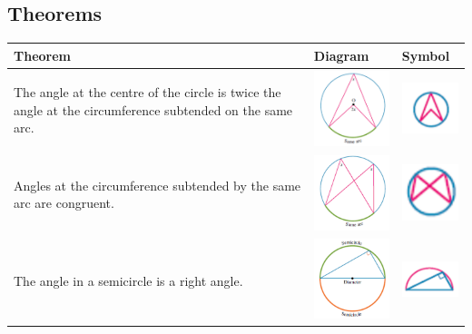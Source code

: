 \documentclass[a4paper,10pt]{report}
\begin{document}
\subsection{Theorems}
\begin{center}
	\begin{tabular}[center]{p{5cm}|p{3cm}|p{2cm}}
		Theorem                                                                                                              & Diagram                                       & Symbol                                               \\ \hline
		The angle at the centre of the circle is twice the angle at the circumference subtended on the same arc.             & \includegraphics[width=3cm]{circle theorem 1} & \includegraphics[width=2cm]{circle theorem 1 symbol} \\
		Angles at the circumference subtended by the same arc are congruent.                                                 & \includegraphics[width=3cm]{circle theorem 2} & \includegraphics[width=2cm]{circle theorem 2 symbol} \\
		The angle in a semicircle is a right angle.                                                                          & \includegraphics[width=3cm]{circle theorem 3} & \includegraphics[width=2cm]{circle theorem 3 symbol} \\

\end{tabular}
\end{center}
\end{document}
